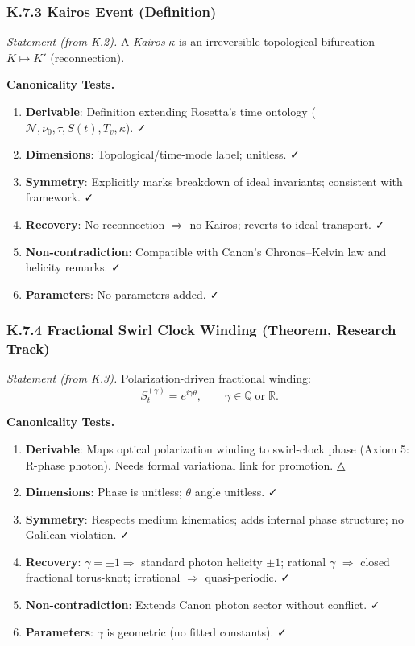 \documentclass[10pt,reprint,aps,onecolumn,nofootinbib]{revtex4-2}
\begin{document}
    \subsubsection*{K.7.3 Kairos Event (Definition)}
    \emph{Statement (from K.2).} A \emph{Kairos} $\kappa$ is an irreversible topological bifurcation $K\mapsto K'$ (reconnection).

    \textbf{Canonicality Tests.}
    \begin{enumerate}
        \item \textbf{Derivable}: Definition extending Rosetta’s time ontology ($\mathcal{N},\nu_0,\tau,S(t),T_v,\kappa$). ✓
        \item \textbf{Dimensions}: Topological/time-mode label; unitless. ✓
        \item \textbf{Symmetry}: Explicitly marks breakdown of ideal invariants; consistent with framework. ✓
        \item \textbf{Recovery}: No reconnection $\Rightarrow$ no Kairos; reverts to ideal transport. ✓
        \item \textbf{Non-contradiction}: Compatible with Canon’s Chronos–Kelvin law and helicity remarks. ✓
        \item \textbf{Parameters}: No parameters added. ✓
    \end{enumerate}

    \subsubsection*{K.7.4 Fractional Swirl Clock Winding (Theorem, Research Track)}
    \emph{Statement (from K.3).} Polarization-driven fractional winding:
    \[
        S_t^{(\gamma)} = e^{i\gamma\theta}, \qquad \gamma\in\mathbb{Q}\;\text{or}\;\mathbb{R}.
    \]

    \textbf{Canonicality Tests.}
    \begin{enumerate}
        \item \textbf{Derivable}: Maps optical polarization winding to swirl-clock phase (Axiom 5: R-phase photon). Needs formal variational link for promotion. △
        \item \textbf{Dimensions}: Phase is unitless; $\theta$ angle unitless. ✓
        \item \textbf{Symmetry}: Respects medium kinematics; adds internal phase structure; no Galilean violation. ✓
        \item \textbf{Recovery}: $\gamma=\pm 1 \Rightarrow$ standard photon helicity $\pm 1$; rational $\gamma$ $\Rightarrow$ closed fractional torus-knot; irrational $\Rightarrow$ quasi-periodic. ✓
        \item \textbf{Non-contradiction}: Extends Canon photon sector without conflict. ✓
        \item \textbf{Parameters}: $\gamma$ is geometric (no fitted constants). ✓
    \end{enumerate}
\end{document}
